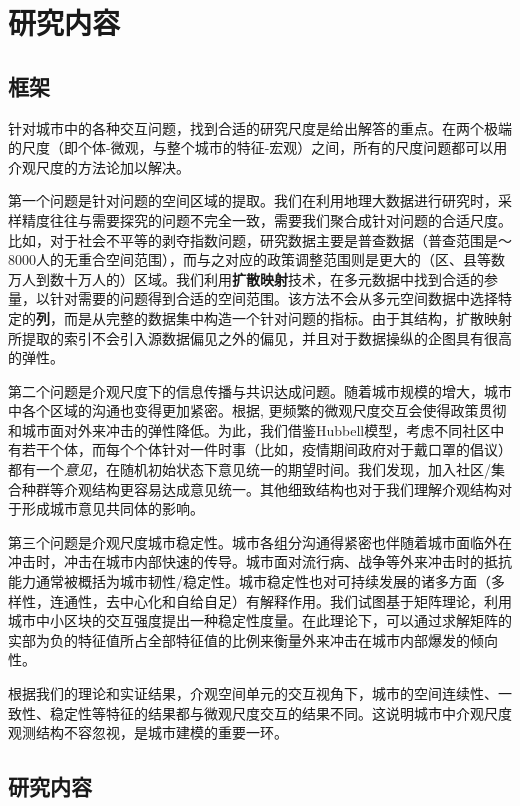 \chapter{研究内容}

\section{框架}
针对城市中的各种交互问题，找到合适的研究尺度是给出解答的重点。在两个极端的尺度（即个体-微观，与整个城市的特征-宏观）之间，所有的尺度问题都可以用介观尺度的方法论加以解决。

第一个问题是针对问题的空间区域的提取。我们在利用地理大数据进行研究时，采样精度往往与需要探究的问题不完全一致，需要我们聚合成针对问题的合适尺度。比如，对于社会不平等的剥夺指数问题，研究数据主要是普查数据（普查范围是～8000人的无重合空间范围），而与之对应的政策调整范围则是更大的（区、县等数万人到数十万人的）区域。我们利用\textbf{扩散映射}技术，在多元数据中找到合适的参量，以针对需要的问题得到合适的空间范围。该方法不会从多元空间数据中选择特定的\textbf{列}，而是从完整的数据集中构造一个针对问题的指标。由于其结构，扩散映射所提取的索引不会引入源数据偏见之外的偏见，并且对于数据操纵的企图具有很高的弹性。

第二个问题是介观尺度下的信息传播与共识达成问题。随着城市规模的增大，城市中各个区域的沟通也变得更加紧密。根据\cite{stark2008decelerating}, 更频繁的微观尺度交互会使得政策贯彻和城市面对外来冲击的弹性降低。为此，我们借鉴Hubbell模型\cite{hubbell2001unified}，考虑不同社区中有若干个体，而每个个体针对一件时事（比如，疫情期间政府对于戴口罩的倡议）都有一个\textit{意见}，在随机初始状态下意见统一的期望时间。我们发现，加入社区/集合种群等介观结构更容易达成意见统一。其他细致结构也对于我们理解介观结构对于形成城市意见共同体的影响。

第三个问题是介观尺度城市稳定性。城市各组分沟通得紧密也伴随着城市面临外在冲击时，冲击在城市内部快速的传导。城市面对流行病、战争等外来冲击时的抵抗能力通常被概括为城市韧性/稳定性。城市稳定性也对可持续发展的诸多方面（多样性，连通性，去中心化和自给自足）有解释作用。我们试图基于矩阵理论，利用城市中小区块的交互强度提出一种稳定性度量。在此理论下，可以通过求解矩阵的实部为负的特征值所占全部特征值的比例来衡量外来冲击在城市内部爆发的倾向性。

根据我们的理论和实证结果，介观空间单元的交互视角下，城市的空间连续性、一致性、稳定性等特征的结果都与微观尺度交互的结果不同。这说明城市中介观尺度观测结构不容忽视，是城市建模的重要一环。


\section{研究内容}


